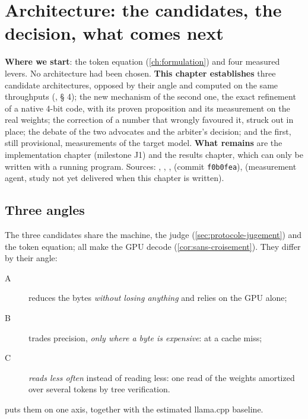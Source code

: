\chapter{Architecture: the candidates, the decision, what comes next}\label{ch:avenir}

\begin{origine}
\textbf{Where we start}: the token equation (\cref{ch:formulation}) and four measured levers. No architecture had been chosen.
\textbf{This chapter establishes} three candidate architectures, opposed by their angle and computed on the same throughputs (, § 4); the new mechanism of the second one, the exact refinement of a native 4-bit code, with its proven proposition and its measurement on the real weights; the correction of a number that wrongly favoured it, struck out in place; the debate of the two advocates and the arbiter's decision; and the first, still provisional, measurements of the target model.
\textbf{What remains} are the implementation chapter (milestone J1) and the results chapter, which can only be written with a running program.
Sources: , , ,  (commit \texttt{f0b0fea}),  (measurement agent, study not yet delivered when this chapter is written).
\end{origine}

\section{Three angles}\label{sec:trois-angles}

The three candidates share the machine, the judge (\cref{sec:protocole-jugement}) and the token equation; all make the GPU decode (\cref{cor:sans-croisement}). They differ by their angle:
\begin{description}
\item[A] reduces the bytes \emph{without losing anything} and relies on the GPU alone;
\item[B] trades precision, \emph{only where a byte is expensive}: at a cache miss;
\item[C] \emph{reads less often} instead of reading less: one read of the weights amortized over several tokens by tree verification.
\end{description}
 puts them on one axis, together with the estimated llama.cpp baseline.

